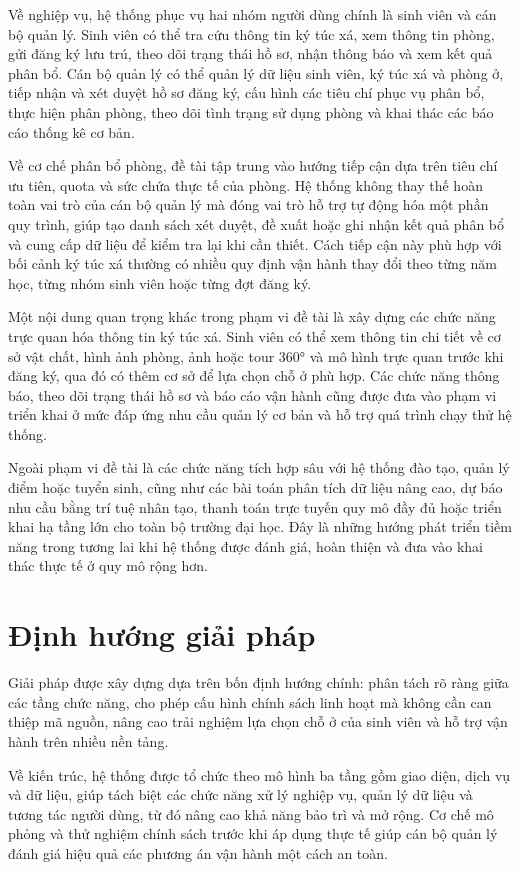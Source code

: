 \documentclass[../DoAn.tex]{subfiles}
\begin{document}
Về nghiệp vụ, hệ thống phục vụ hai nhóm người dùng chính là sinh viên và cán bộ quản lý. Sinh viên có thể tra cứu thông tin ký túc xá, xem thông tin phòng, gửi đăng ký lưu trú, theo dõi trạng thái hồ sơ, nhận thông báo và xem kết quả phân bổ. Cán bộ quản lý có thể quản lý dữ liệu sinh viên, ký túc xá và phòng ở, tiếp nhận và xét duyệt hồ sơ đăng ký, cấu hình các tiêu chí phục vụ phân bổ, thực hiện phân phòng, theo dõi tình trạng sử dụng phòng và khai thác các báo cáo thống kê cơ bản.

Về cơ chế phân bổ phòng, đề tài tập trung vào hướng tiếp cận dựa trên tiêu chí ưu tiên, quota và sức chứa thực tế của phòng. Hệ thống không thay thế hoàn toàn vai trò của cán bộ quản lý mà đóng vai trò hỗ trợ tự động hóa một phần quy trình, giúp tạo danh sách xét duyệt, đề xuất hoặc ghi nhận kết quả phân bổ và cung cấp dữ liệu để kiểm tra lại khi cần thiết. Cách tiếp cận này phù hợp với bối cảnh ký túc xá thường có nhiều quy định vận hành thay đổi theo từng năm học, từng nhóm sinh viên hoặc từng đợt đăng ký.

Một nội dung quan trọng khác trong phạm vi đề tài là xây dựng các chức năng trực quan hóa thông tin ký túc xá. Sinh viên có thể xem thông tin chi tiết về cơ sở vật chất, hình ảnh phòng, ảnh hoặc tour 360° và mô hình trực quan trước khi đăng ký, qua đó có thêm cơ sở để lựa chọn chỗ ở phù hợp. Các chức năng thông báo, theo dõi trạng thái hồ sơ và báo cáo vận hành cũng được đưa vào phạm vi triển khai ở mức đáp ứng nhu cầu quản lý cơ bản và hỗ trợ quá trình chạy thử hệ thống.

Ngoài phạm vi đề tài là các chức năng tích hợp sâu với hệ thống đào tạo, quản lý điểm hoặc tuyển sinh, cũng như các bài toán phân tích dữ liệu nâng cao, dự báo nhu cầu bằng trí tuệ nhân tạo, thanh toán trực tuyến quy mô đầy đủ hoặc triển khai hạ tầng lớn cho toàn bộ trường đại học. Đây là những hướng phát triển tiềm năng trong tương lai khi hệ thống được đánh giá, hoàn thiện và đưa vào khai thác thực tế ở quy mô rộng hơn.
\section{Định hướng giải pháp}

\label{section:1.3}
Giải pháp được xây dựng dựa trên bốn định hướng chính: phân tách rõ ràng giữa các tầng chức năng, cho phép cấu hình chính sách linh hoạt mà không cần can thiệp mã nguồn, nâng cao trải nghiệm lựa chọn chỗ ở của sinh viên và hỗ trợ vận hành trên nhiều nền tảng.

Về kiến trúc, hệ thống được tổ chức theo mô hình ba tầng gồm giao diện, dịch vụ và dữ liệu, giúp tách biệt các chức năng xử lý nghiệp vụ, quản lý dữ liệu và tương tác người dùng, từ đó nâng cao khả năng bảo trì và mở rộng. Cơ chế mô phỏng và thử nghiệm chính sách trước khi áp dụng thực tế giúp cán bộ quản lý đánh giá hiệu quả các phương án vận hành một cách an toàn.
\end{document}
